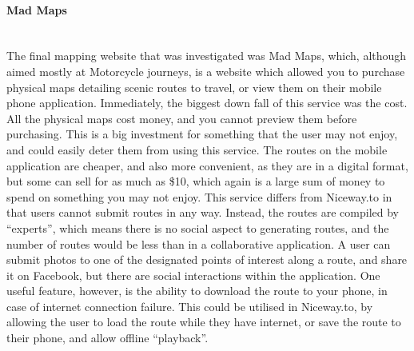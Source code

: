 \documentclass[a4paper,twoside,notitlepage,11pt]{article}
\begin{document}
\newpage 
\paragraph{Mad Maps}\ \\
The final mapping website that was investigated was Mad Maps, which, although aimed mostly at Motorcycle journeys, is a website which allowed you to purchase physical maps detailing scenic routes to travel, or view them on their mobile phone application. Immediately, the biggest down fall of this service was the cost. All the physical maps cost money, and you cannot preview them before purchasing. This is a big investment for something that the user may not enjoy, and could easily deter them from using this service. The routes on the mobile application are cheaper, and also more convenient, as they are in a digital format, but some can sell for as much as \$10, which again is a large sum of money to spend on something you may not enjoy. This service differs from Niceway.to in that users cannot submit routes in any way. Instead, the routes are compiled by ``experts'', which means there is no social aspect to generating routes, and the number of routes would be less than in a collaborative application. A user can submit photos to one of the designated points of interest along a route, and share it on Facebook, but there are social interactions within the application. One useful feature, however, is the ability to download the route to your phone, in case of internet connection failure. This could be utilised in Niceway.to, by allowing the user to load the route while they have internet, or save the route to their phone, and allow offline ``playback''. 
\end{document}
